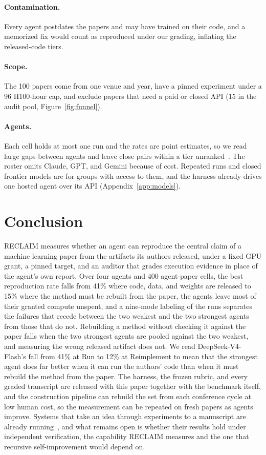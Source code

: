 \documentclass{article} %
\begin{document}
\paragraph{Contamination.} Every agent postdates the papers and may have
trained on their code, and a memorized fix would count as reproduced under our grading, inflating the released-code tiers.

\paragraph{Scope.} The 100 papers come from one venue and year, have a pinned experiment under a 96 H100-hour cap, and exclude papers that need a paid or closed API (15 in the audit pool, Figure~\ref{fig:funnel}).

\paragraph{Agents.} Each cell holds at most one run and the rates are point
estimates, so we read large gaps between agents and leave close pairs
within a tier unranked~\citep{bjarnason2026randomness}. The roster omits Claude, GPT, and Gemini
because of cost. Repeated
runs and closed frontier models are for groups with access to them, and
the harness already drives one hosted agent over its API
(Appendix~\ref{app:models}).

\section{Conclusion}
\label{sec:conclusion}

RECLAIM measures whether an agent can reproduce the central claim of a
machine learning paper from the artifacts its authors released, under a
fixed GPU grant, a pinned target, and an auditor that grades execution
evidence in place of the agent's own report. Over four agents and 400
agent-paper cells, the best reproduction rate falls from 41\% where code, data, and
weights are released to 15\% where the method must be rebuilt from the paper,
the agents leave most of their granted compute unspent, and a nine-mode
labeling of the runs separates the failures that recede between the two
weakest and the two strongest agents from those that do not. Rebuilding a
method without checking it against the paper falls when the two strongest
agents are pooled against the two weakest, and measuring the wrong released
artifact does not. We read DeepSeek-V4-Flash's fall from 41\% at Run to 12\% at
Reimplement to mean that the strongest agent does far better when it can
run the authors' code than when it must rebuild the method from the paper. The harness, the frozen rubric, and every graded
transcript are released with this paper together with the benchmark itself,
and the construction pipeline can rebuild the set from each conference cycle at low human cost, so the
measurement can be repeated on fresh papers as agents improve. Systems that take an
idea through experiments to a manuscript are already
running~\citep{lu2024aiscientist,schmidgall2025agentlab,tang2025airesearcher}, and what
remains open is whether their results hold under independent verification, the capability
RECLAIM measures and the one that recursive self-improvement would depend on.
\end{document}
